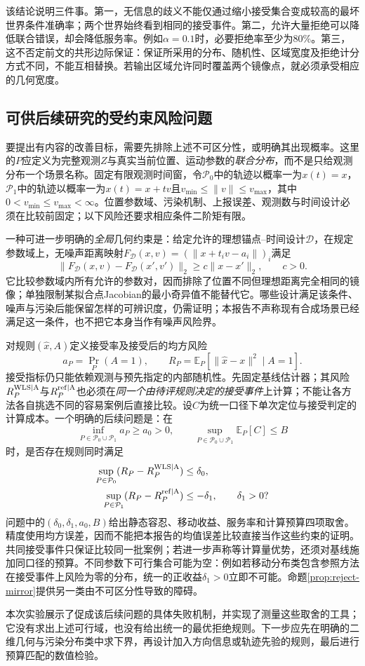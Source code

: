 该结论说明三件事。第一，无信息的歧义不能仅通过缩小接受集合变成较高的最坏世界条件准确率；两个世界始终看到相同的接受事件。第二，允许大量拒绝可以降低联合错误，却会降低服务率。例如$\alpha=0.1$时，必要拒绝率至少为80\%。第三，这不否定前文的共形边际保证：保证所采用的分布、随机性、区域宽度及拒绝计分方式不同，不能互相替换。若输出区域允许同时覆盖两个镜像点，就必须承受相应的几何宽度。

\subsection{可供后续研究的受约束风险问题}
要提出有内容的改善目标，需要先排除上述不可区分性，或明确其出现概率。这里的$P$应定义为完整观测$Z$与真实当前位置、运动参数的\emph{联合分布}，而不是只给观测分布一个场景名称。固定有限观测时间窗，令$\mathcal P_0$中的轨迹以概率一为$x(t)=x$，$\mathcal P_1$中的轨迹以概率一为$x(t)=x+tv$且$v_{\min}\le\|v\|\le v_{\max}$，其中$0<v_{\min}\le v_{\max}<\infty$。位置参数域、污染机制、上报误差、观测数与时间设计必须在比较前固定；以下风险还要求相应条件二阶矩有限。

一种可进一步明确的\emph{全局}几何约束是：给定允许的理想锚点--时间设计$\mathcal D$，在规定参数域上，无噪声距离映射$F_{\mathcal D}(x,v)=(\|x+t_i v-a_i\|)_i$满足
\[
 \|F_{\mathcal D}(x,v)-F_{\mathcal D}(x',v')\|_2
 \ge c\|x-x'\|_2,\qquad c>0.
\]
它比较参数域内所有允许的参数对，因而排除了位置不同但理想距离完全相同的镜像；单独限制某拟合点Jacobian的最小奇异值不能替代它。哪些设计满足该条件、噪声与污染后能保留怎样的可辨识度，仍需证明；本报告不声称现有合成场景已经满足这一条件，也不把它本身当作有噪声风险界。

对规则$(\widehat x,A)$定义接受率及接受后的均方风险
\[
 a_P=\Pr_P(A=1),\qquad
 R_P=\mathbb E_P[\|\widehat x-x\|^2\mid A=1].
\]
接受指标仍只能依赖观测与预先指定的内部随机性。先固定基线估计器；其风险$R_P^{\rm WLS\mid A}$与$R_P^{\rm ref\mid A}$也必须在\emph{同一个由待评规则决定的接受事件}上计算；不能让各方法各自挑选不同的容易案例后直接比较。设$C$为统一口径下单次定位与接受判定的计算成本。一个明确的后续问题是：在
\[
 \inf_{P\in\mathcal P_0\cup\mathcal P_1}a_P\ge a_0>0,
 \qquad
 \sup_{P\in\mathcal P_0\cup\mathcal P_1}\mathbb E_P[C]\le B
\]
时，是否存在规则同时满足
\begin{align}
 \sup_{P\in\mathcal P_0}(R_P-R_P^{\rm WLS\mid A})&\le\delta_0,\\
 \sup_{P\in\mathcal P_1}(R_P-R_P^{\rm ref\mid A})&\le-\delta_1,
 \qquad \delta_1>0?
\end{align}
问题中的$(\delta_0,\delta_1,a_0,B)$给出静态容忍、移动收益、服务率和计算预算四项取舍。精度使用均方误差，因而不能把本报告的均值误差比较直接当作这些约束的证明。共同接受事件只保证比较同一批案例；若进一步声称等计算量优势，还须对基线施加同口径的预算。不同参数下可行集合可能为空：例如若移动分布类包含参照方法在接受事件上风险为零的分布，统一的正收益$\delta_1>0$立即不可能。命题\ref{prop:reject-mirror}提供另一类由不可区分性导致的障碍。

本次实验展示了促成该后续问题的具体失败机制，并实现了测量这些取舍的工具；它没有求出上述可行域，也没有给出统一的最优拒绝规则。下一步应先在明确的二维几何与污染分布类中求下界，再设计加入方向信息或轨迹先验的规则，最后进行预算匹配的数值检验。
